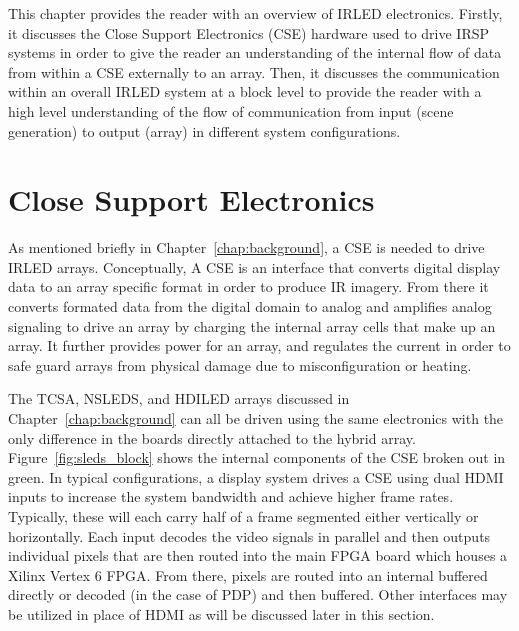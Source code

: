 \label{chap:system_overview}
This chapter provides the reader with an overview of IRLED electronics. Firstly, it discusses the Close Support Electronics (CSE) hardware used to drive IRSP systems in order to give the reader an understanding of the internal flow of data from within a CSE externally to an array. Then, it discusses the communication within an overall IRLED system at a block level to provide the reader with a high level understanding of the flow of communication from input (scene generation) to output (array) in different system configurations.

\section{Close Support Electronics}
    \label{sec:close_support_electronics}
    As mentioned briefly in Chapter~\ref{chap:background}, a CSE is needed to drive IRLED arrays. Conceptually, A CSE is an interface that converts digital display data to an array specific format in order to produce IR imagery. From there it converts formated data from the digital domain to analog and amplifies analog signaling to drive an array by charging the internal array cells that make up an array. It further provides power for an array, and regulates the current in order to safe guard arrays from physical damage due to misconfiguration or heating.

    The TCSA, NSLEDS, and HDILED arrays discussed in Chapter~\ref{chap:background} can all be driven using the same electronics with the only difference in the boards directly attached to the hybrid array. Figure~\ref{fig:sleds_block} shows the internal components of the CSE broken out in green. In typical configurations, a display system drives a CSE using dual HDMI inputs to increase the system bandwidth and achieve higher frame rates. Typically, these will each carry half of a frame segmented either vertically or horizontally. Each input decodes the video signals in parallel and then outputs individual pixels that are then routed into the main FPGA board which houses a Xilinx Vertex 6 FPGA\cite{XILINX1}. From there, pixels are routed into an internal buffered directly or decoded (in the case of PDP) and then buffered. Other interfaces may be utilized in place of HDMI as will be discussed later in this section.


